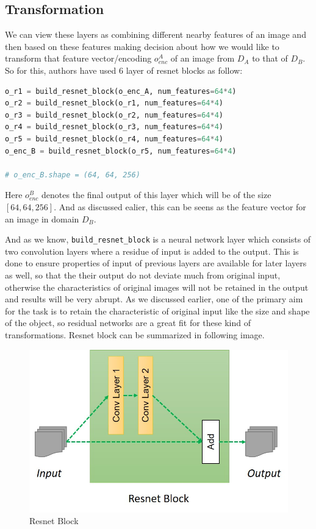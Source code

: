 \documentclass[peerreview]{IEEEtran}
\begin{document}
\subsection{Transformation}
We can view these layers as combining different nearby features of an image and then based on these features making decision about how we would like to transform that feature vector/encoding $o_{enc}^A$ of an image from $D_A$ to that of $D_B$. So for this, authors have used 6 layer of resnet blocks as follow:

\begin{lstlisting}[language=Python]
o_r1 = build_resnet_block(o_enc_A, num_features=64*4)
o_r2 = build_resnet_block(o_r1, num_features=64*4)
o_r3 = build_resnet_block(o_r2, num_features=64*4)
o_r4 = build_resnet_block(o_r3, num_features=64*4)
o_r5 = build_resnet_block(o_r4, num_features=64*4)
o_enc_B = build_resnet_block(o_r5, num_features=64*4)

# o_enc_B.shape = (64, 64, 256)
\end{lstlisting}

Here $o_{enc}^B$ denotes the final output of this layer which will be of the size $[64,64,256]$. And as discussed ealier, this can be seens as the feature vector for an image in domain $D_B$.

And as we know, \verb!build_resnet_block! is a neural network layer which consists of two convolution layers where a residue of input is added to the output. This is done to ensure properties of input of previous layers are available for later layers as well, so that the their output do not deviate much from original input, otherwise the characteristics of original images will not be retained in the output and results will be very abrupt. As we discussed earlier, one of the primary aim for the task is to retain the characteristic of original input like the size and shape of the object, so residual networks are a great fit for these kind of transformations. Resnet block can be summarized in following image.

\begin{figure}[H]
    \centering
    \includegraphics[width=0.8\columnwidth]{Resnet.jpg}
    \caption{Resnet Block}
    \label{fig:s=resnet}
\end{figure}
\end{document}
